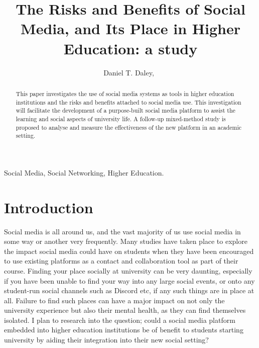 \documentclass[lettersize,journal]{IEEEtran}
\begin{document}
\title{The Risks and Benefits of Social Media, and Its Place in Higher Education: a study}

\author{Daniel T. Daley,~}




\maketitle
\begin{abstract}
	This paper investigates the use of social media systems as tools in higher education 
	institutions and the risks and benefits attached to social media use. This investigation will 
	facilitate the development of a purpose-built social media platform to assist the learning and social
	aspects of university life. A follow-up mixed-method study is proposed to analyse and measure the effectiveness of
	the new platform in an academic setting.
\end{abstract}

\begin{IEEEkeywords}
Social Media, Social Networking, Higher Education.
\end{IEEEkeywords}

\section{Introduction}
	Social media is all around us, and the vast majority of us use social media in some way or another very
	frequently. Many studies have taken place to explore the impact social media could have on students
	when they have been encouraged to use existing platforms as a contact and collaboration tool as part
	of their course. 
    Finding your place socially at university can be very daunting, especially if you have been unable to find
    your way into any large social events, or onto any student-run social channels such as Discord \cite{Discord} etc, if any
    such things are in place at all. Failure to find such places can have a major impact on not only the university
    experience but also their mental health, as they can find themselves isolated. I plan to research into the
    question; could a social media platform embedded into higher education institutions be of benefit to students
    starting university by aiding their integration into their new social setting?
\end{document}
